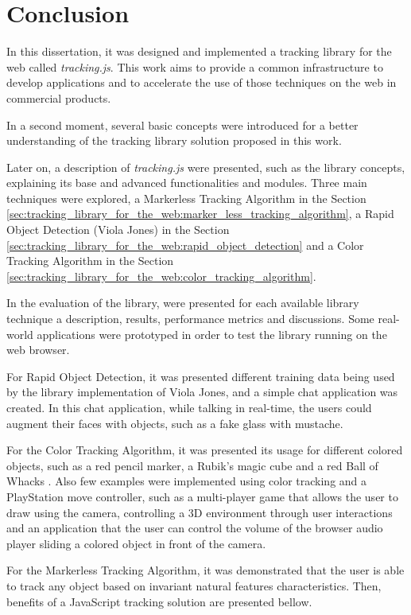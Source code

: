 \chapter{Conclusion} %
\label{cha:conclusion}

In this dissertation, it was designed and implemented a tracking library for the web called \textit{tracking.js}. This work aims to provide a common infrastructure to develop applications and to accelerate the use of those techniques on the web in commercial products.

In a second moment, several basic concepts were introduced for a better understanding of the tracking library solution proposed in this work.

Later on, a description of \textit{tracking.js} were presented, such as the library concepts, explaining its base and advanced functionalities and modules. Three main techniques were explored, a Markerless Tracking Algorithm in the Section \ref{sec:tracking_library_for_the_web:marker_less_tracking_algorithm}, a Rapid Object Detection (Viola Jones) in the Section \ref{sec:tracking_library_for_the_web:rapid_object_detection} and a Color Tracking Algorithm in the Section \ref{sec:tracking_library_for_the_web:color_tracking_algorithm}.

In the evaluation of the library, were presented for each available library technique a description, results, performance metrics and discussions. Some real-world applications were prototyped in order to test the library running on the web browser.

For Rapid Object Detection, it was presented different training data being used by the library implementation of Viola Jones, and a simple chat application was created. In this chat application, while talking in real-time, the users could augment their faces with objects, such as a fake glass with mustache.

For the Color Tracking Algorithm, it was presented its usage for different colored objects, such as a red pencil marker, a Rubik’s magic cube \cite{Rubiks2013} and a red Ball of Whacks \cite{Whack2013}. Also few examples were implemented using color tracking and a PlayStation move controller, such as a multi-player game that allows the user to draw using the camera, controlling a 3D environment through user interactions and an application that the user can control the volume of the browser audio player sliding a colored object in front of the camera.

For the Markerless Tracking Algorithm, it was demonstrated that the user is able to track any object based on invariant natural features characteristics. Then, benefits of a JavaScript tracking solution are presented bellow.

